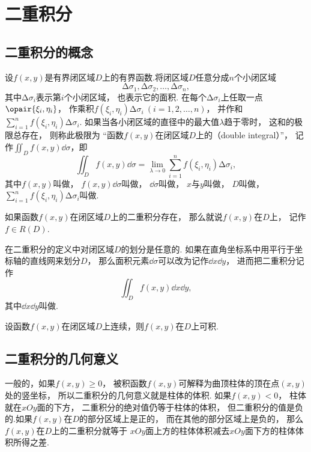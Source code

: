 \section{二重积分}
\subsection{二重积分的概念}
设\(f(x,y)\)是有界闭区域\(D\)上的有界函数.将闭区域\(D\)任意分成\(n\)个小闭区域\[
	\increment\sigma_1,\increment\sigma_2,\dotsc,\increment\sigma_n,
\]
其中\(\increment\sigma_i\)表示第\(i\)个小闭区域，
也表示它的面积.
在每个\(\increment\sigma_i\)上任取一点\(\opair{\xi_i,\eta_i}\)，
作乘积\(f(\xi_i,\eta_i) \increment\sigma_i\ (i=1,2,\dotsc,n)\)，
并作和\(\sum_{i=1}^n f(\xi_i,\eta_i) \increment\sigma_i\).
如果当各小闭区域的直径中的最大值\(\lambda\)趋于零时，
这和的极限总存在，
则称此极限为
“函数\(f(x,y)\)在闭区域\(D\)上的（double integral）”，
记作\(\iint_D f(x,y) \dd\sigma\)，即
\[
	\iint_D f(x,y) \dd\sigma
	= \lim_{\lambda\to0}
	\sum_{i=1}^n f(\xi_i,\eta_i) \increment\sigma_i,
\]
其中\(f(x,y)\)叫做，
\(f(x,y) \dd\sigma\)叫做，
\(\dd\sigma\)叫做，
\(x\)与\(y\)叫做，
\(D\)叫做，
\(\sum_{i=1}^n f(\xi_i,\eta_i) \increment\sigma_i\)叫做.

如果函数\(f(x,y)\)在闭区域\(D\)上的二重积分存在，
那么就说\(f(x,y)\)在\(D\)上，
记作\(f \in R(D)\).

在二重积分的定义中对闭区域\(D\)的划分是任意的.
如果在直角坐标系中用平行于坐标轴的直线网来划分\(D\)，
那么面积元素\(\dd\sigma\)可以改为记作\(\dd{x}\dd{y}\)，
进而把二重积分记作\[
	\iint_{D}{f(x,y)\dd{x}\dd{y}},
\]
其中\(\dd{x}\dd{y}\)叫做.

\begin{theorem}[充分条件]
设函数\(f(x,y)\)在闭区域\(D\)上连续，则\(f(x,y)\)在\(D\)上可积.
\end{theorem}

\subsection{二重积分的几何意义}
一般的，如果\(f(x,y) \geq 0\)，
被积函数\(f(x,y)\)可解释为曲顶柱体的顶在点\((x,y)\)处的竖坐标，
所以二重积分的几何意义就是柱体的体积.
如果\(f(x,y) < 0\)，
柱体就在\(xOy\)面的下方，
二重积分的绝对值仍等于柱体的体积，
但二重积分的值是负的.如果\(f(x,y)\)在\(D\)的部分区域上是正的，
而在其他的部分区域上是负的，
那么\(f(x,y)\)在\(D\)上的二重积分就等于
\(xOy\)面上方的柱体体积减去\(xOy\)面下方的柱体体积所得之差.

